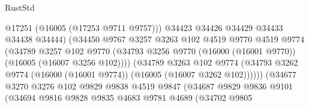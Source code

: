 \begin{lexlean}{RustStd}
\begin{coremodule}
                                        @17251
                                        (@16005 (@17253 @9711 @9757)))
                                      @34423
                                      @34426
                                      @34429
                                      @34433
                                      @34438
                                      @34444)
                                    (@34450
                                      @9767
                                      @3257
                                      @3263
                                      @102
                                      @4519
                                      @9770
                                      @4519
                                      @9774
                                      (@34789
                                        @3257
                                        @102
                                        @9770
                                        (@34793
                                          @3256
                                          @9770
                                          (@16000 (@16001 @9770))
                                          (@16005 (@16007 @3256 @102))))
                                      (@34789
                                        @3263
                                        @102
                                        @9774
                                        (@34793
                                          @3262
                                          @9774
                                          (@16000 (@16001 @9774))
                                          (@16005 (@16007 @3262 @102))))))
                                  (@34677
                                    @3270
                                    @3276
                                    @102
                                    @9829
                                    @9838
                                    @4519
                                    @9847
                                    (@34687
                                      @9829
                                      @9836
                                      @9101
                                      (@34694
                                        @9816
                                        @9828
                                        @9835
                                        @4683
                                        @9781
                                        @4689
                                        (@34702
                                          @9805

\end{coremodule}
\end{lexlean}
